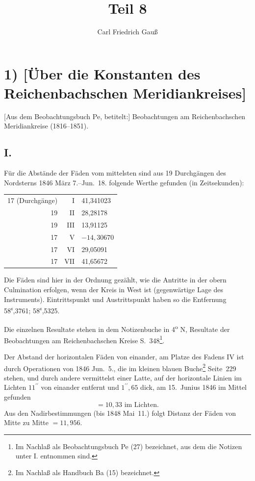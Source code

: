 \documentclass[12pt,a4paper]{article}
\title{Teil 8}
\author{Carl Friedrich Gau\ss}
\date{}
\theoremstyle{plain}
\theoremstyle{definition}
\theoremstyle{remark}
\begin{document}
\maketitle

\section*{1) [\"Uber die Konstanten des Reichenbachschen Meridiankreises]}

[Aus dem Beobachtungsbuch Pe, betitelt:] Beobachtungen am Reichenbachschen Meridiankreise (1816--1851).

\subsection*{I.}

F\"ur die Abst\"ande der F\"aden vom mittelsten sind aus 19 Durchg\"angen des Nordsterns 1846 M\"arz 7.--Jun.~18. folgende Werthe gefunden (in Zeitsekunden):

\begin{center}
\begin{tabular}{r|r|l}
17 (Durchg\"ange) & I  & 41,341023 \\ 
19 & II & 28,28178 \\
19 & III & 13,91125 \\
17 & V  & $-14{,}30670$ \\
17 & VI & 29,05091 \\
17 & VII & 41,65672
\end{tabular}
\end{center}

Die F\"aden sind hier in der Ordnung gez\"ahlt, wie die Antritte in der obern Culmination erfolgen, wenn der Kreis in West ist (gegenw\"artige Lage des Instruments). Eintrittspunkt und Austrittspunkt haben so die Entfernung 58\textsuperscript{s},3761; 58\textsuperscript{s},5325.

Die einzelnen Resultate stehen in dem Notizenbuche in 4\textsuperscript{o} \glqq N\grqq, Resultate der Beobachtungen am Reichenbachschen Kreise S.~348\footnote{Im Nachla\ss{} als Beobachtungsbuch Pe (27) bezeichnet, aus dem die Notizen unter I. entnommen sind.}.

Der Abstand der horizontalen F\"aden von einander, am Platze des Fadens IV ist durch Operationen von 1846 Jun.~5., die im kleinen blauen Buche\footnote{Im Nachla\ss{} als Handbuch Ba (15) bezeichnet.} Seite~229 stehen, und durch andere vermittelst einer Latte, auf der horizontale Linien im Lichten $11^{\prime\prime}$ von einander entfernt und $1^{\prime\prime}{,}65$ dick, am 15.~Junius 1846 im Mittel gefunden
\[
= 10{,}33 \text{ im Lichten}.
\]
Aus den Nadirbestimmungen (bis 1848 Mai~11.) folgt Distanz der F\"aden von Mitte zu Mitte $= 11{,}956$.
\end{document}

